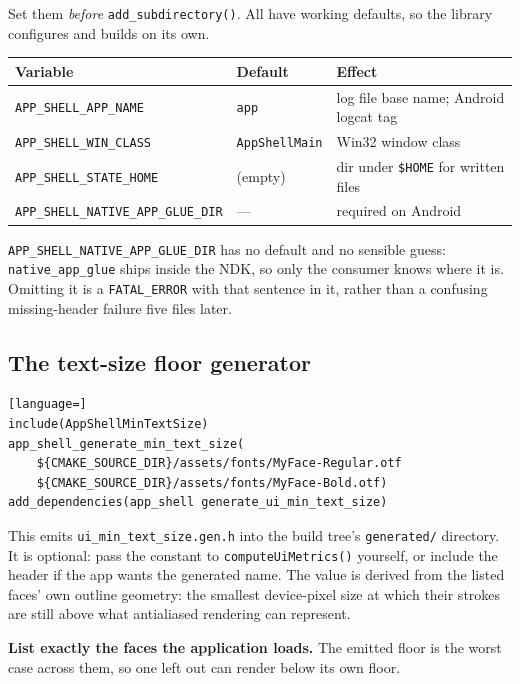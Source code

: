 \documentclass[11pt,a4paper]{article}
\begin{document}
Set them \emph{before} \texttt{add\_subdirectory()}. All have working defaults,
so the library configures and builds on its own.

\begin{center}
\begin{tabular}{@{}lll@{}}
\toprule
Variable & Default & Effect \\
\midrule
\texttt{APP\_SHELL\_APP\_NAME}   & \texttt{app}          & log file base name; Android logcat tag \\
\texttt{APP\_SHELL\_WIN\_CLASS}  & \texttt{AppShellMain} & Win32 window class \\
\texttt{APP\_SHELL\_STATE\_HOME} & (empty)               & dir under \texttt{\$HOME} for written files \\
\texttt{APP\_SHELL\_NATIVE\_APP\_GLUE\_DIR} & --- & required on Android \\
\bottomrule
\end{tabular}
\end{center}

\texttt{APP\_SHELL\_NATIVE\_APP\_GLUE\_DIR} has no default and no sensible
guess: \texttt{native\_app\_glue} ships inside the NDK, so only the consumer
knows where it is. Omitting it is a \texttt{FATAL\_ERROR} with that sentence in
it, rather than a confusing missing-header failure five files later.

\subsection{The text-size floor generator}
\label{sec:mintext}

\begin{lstlisting}[language=]
include(AppShellMinTextSize)
app_shell_generate_min_text_size(
    ${CMAKE_SOURCE_DIR}/assets/fonts/MyFace-Regular.otf
    ${CMAKE_SOURCE_DIR}/assets/fonts/MyFace-Bold.otf)
add_dependencies(app_shell generate_ui_min_text_size)
\end{lstlisting}

This emits \texttt{ui\_min\_text\_size.gen.h} into the build tree's
\texttt{generated/} directory. It is optional: pass the constant to
\texttt{computeUiMetrics()} yourself, or include the header if the app wants
the generated name. The value is derived from the listed
faces' own outline geometry: the smallest device-pixel size at which their
strokes are still above what antialiased rendering can represent.

\textbf{List exactly the faces the application loads.} The emitted floor is the
worst case across them, so one left out can render below its own floor.
\end{document}
